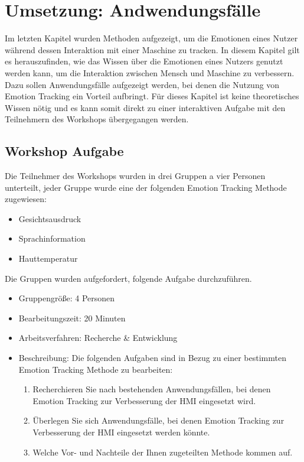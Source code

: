 \section{Umsetzung: Andwendungsfälle}\label{Umsetzung_Anwendungsfaelle}
Im letzten Kapitel wurden Methoden aufgezeigt, um die Emotionen eines Nutzer während dessen Interaktion mit einer Maschine zu tracken. In diesem Kapitel gilt es herauszufinden, wie das Wissen über die Emotionen eines Nutzers genutzt werden kann, um die Interaktion zwischen Mensch und Maschine zu verbessern. Dazu sollen Anwendungsfälle aufgezeigt werden, bei denen die Nutzung von Emotion Tracking ein Vorteil aufbringt. Für dieses Kapitel ist keine theoretisches Wissen nötig und es kann somit direkt zu einer interaktiven Aufgabe mit den Teilnehmern des Workshops übergegangen werden.

\subsection{Workshop Aufgabe}
Die Teilnehmer des Workshops wurden in drei Gruppen a vier Personen unterteilt, jeder Gruppe wurde eine der folgenden Emotion Tracking Methode zugewiesen:
\begin{itemize}
	\item Gesichtsausdruck
	\item Sprachinformation
	\item Hauttemperatur
\end{itemize}
Die Gruppen wurden aufgefordert, folgende Aufgabe durchzuführen.
\begin{itemize}
	\item Gruppengröße: 4 Personen
	\item Bearbeitungszeit: 20 Minuten
	\item Arbeitsverfahren: Recherche & Entwicklung
	\item Beschreibung: Die folgenden Aufgaben sind in Bezug zu einer bestimmten Emotion Tracking Methode zu bearbeiten:
	\begin{enumerate}
		\item Recherchieren Sie nach bestehenden Anwendungsfällen, bei denen Emotion Tracking zur Verbesserung der HMI eingesetzt wird.
		\item Überlegen Sie sich Anwendungsfälle, bei denen Emotion Tracking zur Verbesserung der HMI eingesetzt werden könnte.
		\item Welche Vor- und Nachteile der Ihnen zugeteilten Methode kommen auf.
	\end{enumerate}
\end{itemize}

